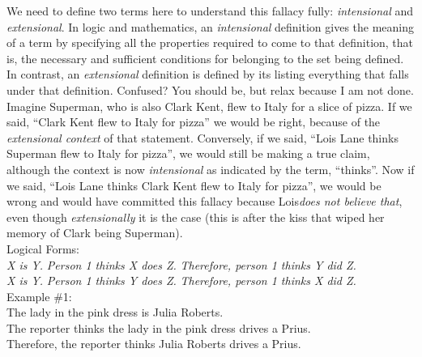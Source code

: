 \documentclass[a4paper,12pt,single,pdftex]{scrartcl}
\begin{document}
    
      We need to define two terms here to understand this fallacy fully: {\it intensional}  and {\it extensional}.  In logic and mathematics, an {\it intensional}  definition gives the meaning of a term by specifying all the properties required to come to that definition, that is, the necessary and sufficient conditions for belonging to the set being defined.  In contrast, an {\it extensional} definition is defined by its listing everything that falls under that definition.  Confused?  You should be, but relax because I am not done.
    \\

    
      Imagine Superman, who is also Clark Kent, flew to Italy for a slice of pizza.  If we said, “Clark Kent flew to Italy for pizza” we would be right, because of the {\it extensional context} of that statement.  Conversely, if we said, “Lois Lane thinks Superman flew to Italy for pizza”, we would still be making a true claim, although the context is now {\it intensional} as indicated by the term, “thinks”.  Now if we said, “Lois Lane thinks Clark Kent flew to Italy for pizza”, we would be wrong and would have committed this fallacy because Lois{\it  does not believe that}, even though {\it extensionally} it is the case (this is after the kiss that wiped her memory of Clark being Superman).
    \\

    
      Logical Forms:
    \\

    
      {\em X is Y.} \newline
{\em Person 1 thinks X does Z.} \newline
{\em Therefore, person 1 thinks Y did Z.}
    \\

    
      {\em X is Y.} \newline
{\em Person 1 thinks Y does Z.} \newline
{\em Therefore, person 1 thinks X did Z.}
    \\

    
      Example \#1:
    \\

    
      The lady in the pink dress is Julia Roberts.
    \\

    
      The reporter thinks the lady in the pink dress drives a Prius.
    \\

    
      Therefore, the reporter thinks Julia Roberts drives a Prius.
    \\
\end{document}
